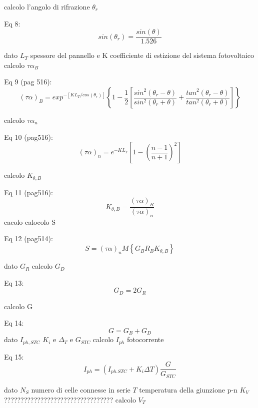 \documentclass{article}
\begin{document}
calcolo l'angolo di rifrazione $\theta_{r}$

Eq 8:
\begin{equation}
    sin(\theta_{r})=\frac{sin(\theta)}{1.526}
\end{equation}

dato $L_{T}$ spessore del pannello e K coefficiente di estizione del sistema fotovoltaico calcolo $\tau \alpha _{B}$

Eq 9 (pag 516):
\begin{equation}
    (\tau \alpha)_{B}=exp^{-[KL_{T}/cos(\theta_{r})]} \left\{1-\frac{1}{2}\left[\frac{sin^{2}(\theta_{r}-\theta)}{sin^{2}(\theta_{r}+\theta)}+\frac{tan^{2}(\theta_{r}-\theta)}{tan^{2}(\theta_{r}+\theta)}\right]\right\}
\end{equation}

calcolo $\tau \alpha _{n}$

Eq 10 (pag516):
\begin{equation}
   (\tau \alpha)_{n} =e^{-KL_{T}}\left[1-\left(\frac{n-1}{n+1}\right)^2\right]
\end{equation}

calcolo $K_{\theta , B}$

 Eq 11 (pag516):
\begin{equation}
   K_{\theta,B}=\frac{(\tau \alpha)_{B}}{(\tau \alpha)_{n}}
\end{equation}
cacolo
calocolo S

Eq 12 (pag514):
\begin{equation}
   S=(\tau \alpha)_{n} M\left\{G_{B} R_{B} K_{\theta,B}\right\}
\end{equation}

dato $G_{R}$ calcolo $G_{D}$

Eq 13:
\begin{equation}
    G _{D}=2G_{R}
\end{equation}

calcolo G

Eq 14:
\begin{equation}
    G=G_{B}+G_{D}
\end{equation}
dato $I_{ph,STC}$ $K_{i}$ e $\Delta_{T}$ e $G_{STC}$ calcolo $I_{ph}$ fotocorrente

Eq 15:
\begin{equation}
    I_{ph}=(I_{ph.STC}+K_{i}\Delta T)\frac{G}{G_{STC}}
\end{equation}

dato $N_{S}$ numero di celle connesse in serie $T$ temperatura della giunzione p-n $K_{V}$ ????????????????????????????????? calcolo $V_{T}$
\end{document}
